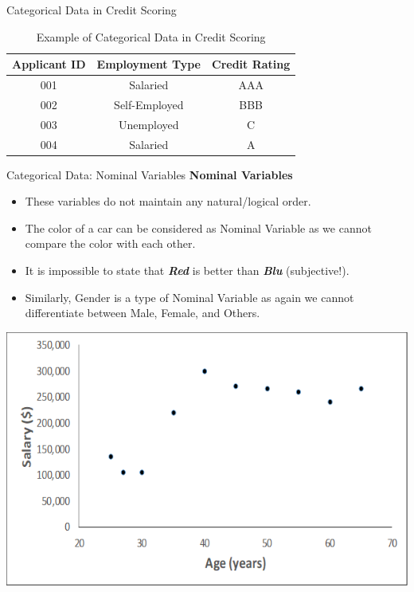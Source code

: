 \documentclass[11pt]{beamer}
\begin{document}
%
%
\begin{frame}{Categorical Data in Credit Scoring}
    
    \begin{table}[]
        \centering
        \renewcommand{\arraystretch}{1.5} %
        \begin{tabular}{|c|c|c|}
            \hline
            \rule{0pt}{15pt} %
            \textbf{Applicant ID} & \textbf{Employment Type} & \textbf{Credit Rating} \\
            \hline
            001 & Salaried & AAA \\
            002 & Self-Employed & BBB \\
            003 & Unemployed & C \\
            004 & Salaried & A \\
            \hline
        \end{tabular}
        \vspace{0.5cm}
        \caption{Example of Categorical Data in Credit Scoring}
    \end{table}
    
\end{frame}
%
%
\begin{frame}{Categorical Data: Nominal Variables}
\textbf{Nominal Variables}
	\begin{itemize}
		\item These variables do not maintain any natural/logical order. 
		\item The color of a car can be considered as Nominal Variable as we cannot compare the color with each other. 
		\item It is impossible to state that \textbf{\textit{Red}} is better than \textbf{\textit{Blu}} (subjective!). 
		\item Similarly, Gender is a type of Nominal Variable as again we cannot differentiate between Male, Female, and Others.
	\end{itemize}
\begin{center}
\includegraphics[scale=.5]{../05-pictures/lesson-2-1_pic_1.png} 
\end{center}	
\end{frame}
\end{document}
